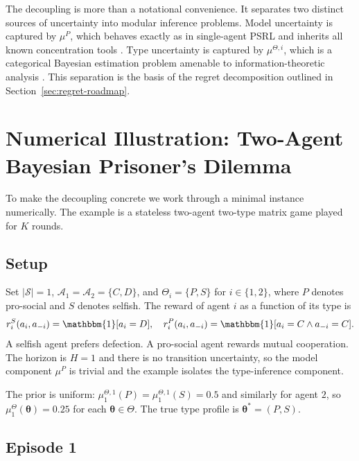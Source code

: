 \begin{remark}
The decoupling is more than a notational convenience. It separates two distinct sources of uncertainty into modular inference problems. Model uncertainty is captured by $\mu^P$, which behaves exactly as in single-agent PSRL and inherits all known concentration tools \citep{agrawal2017optimistic}. Type uncertainty is captured by $\mu^{\Theta,i}$, which is a categorical Bayesian estimation problem amenable to information-theoretic analysis \citep{russo2014learning}. This separation is the basis of the regret decomposition outlined in Section~\ref{sec:regret-roadmap}.
\end{remark}

\section{Numerical Illustration: Two-Agent Bayesian Prisoner's Dilemma}
\label{sec:example}

To make the decoupling concrete we work through a minimal instance numerically. The example is a stateless two-agent two-type matrix game played for $K$ rounds.

\subsection{Setup}

Set $|\mathcal{S}| = 1$, $\mathcal{A}_1 = \mathcal{A}_2 = \{C, D\}$, and $\Theta_i = \{P, S\}$ for $i \in \{1, 2\}$, where $P$ denotes pro-social and $S$ denotes selfish. The reward of agent $i$ as a function of its type is
\begin{equation}
r_i^S(a_i, a_{-i}) = \mathbbm{1}[a_i = D], \quad r_i^P(a_i, a_{-i}) = \mathbbm{1}[a_i = C \wedge a_{-i} = C].
\end{equation}
A selfish agent prefers defection. A pro-social agent rewards mutual cooperation. The horizon is $H = 1$ and there is no transition uncertainty, so the model component $\mu^P$ is trivial and the example isolates the type-inference component.

The prior is uniform: $\mu_1^{\Theta,1}(P) = \mu_1^{\Theta,1}(S) = 0.5$ and similarly for agent $2$, so $\mu_1^\Theta(\boldsymbol{\theta}) = 0.25$ for each $\boldsymbol{\theta} \in \Theta$. The true type profile is $\boldsymbol{\theta}^* = (P, S)$.

\subsection{Episode 1}

